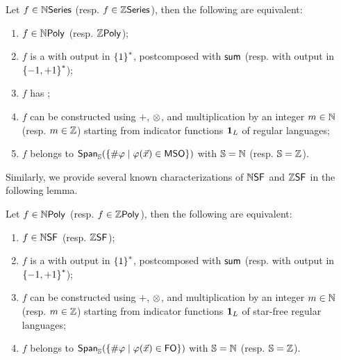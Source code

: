\begin{lemma}[TODO]
    \label{polynomial-rational-polyreg:fact}
    Let $f \in \mathbb{N}\mathsf{Series}$ (resp. $f \in \mathbb{Z}\mathsf{Series}$), then
    the following are equivalent:
    \begin{enumerate}
        \item $f \in \NPoly$ (resp. $\ZPoly$);
        \item $f$ is a  with output
            in $\mathopen{\{} 1 \mathclose{\}}^*$,
            postcomposed with $\mathsf{sum}$
            (resp. with output in $\mathopen{\{} -1,+1 \mathclose{\}}^*$);
        \item $f$ has ;
        \item $f$ can be constructed
            using $+$, $\mathrel{\otimes}$, and multiplication by
            an integer $m \in \mathbb{N}$ (resp. $m \in \mathbb{Z}$)
            starting from
            indicator functions $\mathbf{1}_{L}$ of regular languages;
        \item \label{npoly-counting-mso:item} $f$ belongs to
            $\mathop{\mathsf{Span}_{\mathbb{S}}}(\mathopen{\{} {{\#}\varphi} \mid \varphi(\vec{x}) \in \mathsf{MSO} \mathclose{\}})$
            with $\mathbb{S} = \mathbb{N}$
            (resp. $\mathbb{S} = \mathbb{Z}$).
    \end{enumerate}
\end{lemma}

Similarly, we provide several known characterizations of
$\NSF$ and $\ZSF$ in the following lemma.

\begin{lemma}[TODO]
    Let $f \in \NPoly$ (resp. $f \in \ZPoly$), then
    the following are equivalent:
    \begin{enumerate}
        \item $f \in \NSF$ (resp. $\ZSF$);
        \item $f$ is a  with output
            in $\mathopen{\{} 1 \mathclose{\}}^*$,
            postcomposed with $\mathsf{sum}$
            (resp. with output in $\mathopen{\{} -1,+1 \mathclose{\}}^*$);
        \item $f$ can be constructed
            using $+$, $\mathrel{\otimes}$, and multiplication by
            an integer $m \in \mathbb{N}$ (resp. $m \in \mathbb{Z}$)
            starting from
            indicator functions $\mathbf{1}_{L}$ of star-free regular languages;
        \item $f$ belongs to
            $\mathop{\mathsf{Span}_{\mathbb{S}}}(\mathopen{\{} {{\#}\varphi} \mid \varphi(\vec{x}) \in \mathsf{FO} \mathclose{\}})$
            with $\mathbb{S} = \mathbb{N}$
            (resp. $\mathbb{S} = \mathbb{Z}$).
    \end{enumerate}
\end{lemma}

